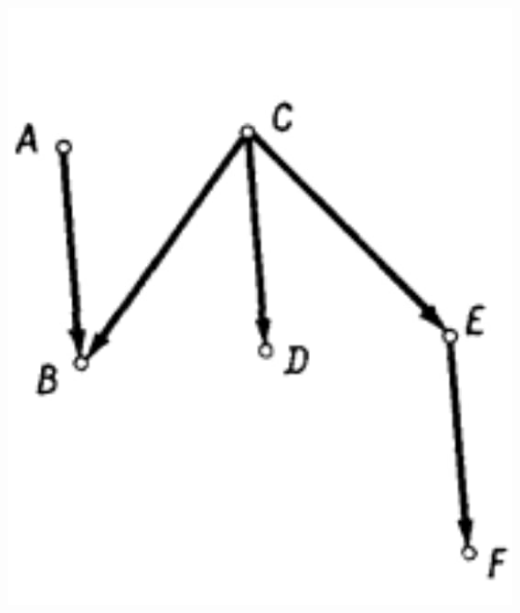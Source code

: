 \begin{paracol}{2}
{\begin{minipage}{0.3\textwidth} %
    \includegraphics[scale=0.4]{рис1.jpg}
\end{minipage}
\begin{minipage}{0.2\textwidth} 
\end{minipage}

}
\end{paracol}
